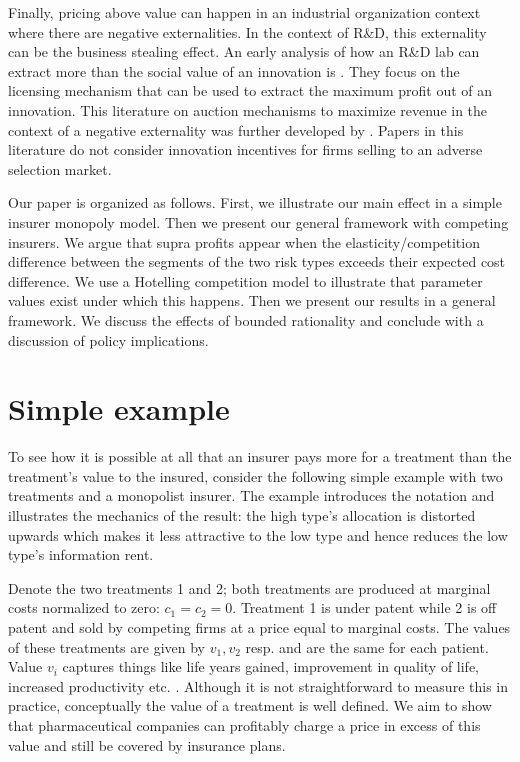 \documentclass[a4paper,12pt]{article}
\begin{document}
Finally, pricing above value can happen in an industrial organization context where there are negative externalities. In the context of R\&D, this externality can be the business stealing effect. An early analysis of how an R\&D lab can extract more than the social value of an innovation is \cite{KatzShapiro1986}. They focus on the licensing mechanism that can be used to extract the maximum profit out of an innovation. This literature on auction mechanisms to maximize revenue in the context of a negative externality was further developed by \cite{jehiel1996}. Papers in this literature do not consider innovation incentives for firms selling to an adverse selection market.

Our paper is organized as follows. First, we illustrate our main effect in a simple insurer monopoly model. Then we present our general framework with competing insurers. We argue that supra profits appear when the elasticity/competition difference between the segments of the two risk types exceeds their expected cost difference. We use a Hotelling competition model to illustrate that parameter values exist under which this happens. Then we present our results in a general framework. We discuss the effects of bounded rationality and conclude with a discussion of policy implications.

\section{Simple example}
\label{sec:org5b31619}

To see how it is possible at all that an insurer pays more for a treatment than the treatment's value to the insured, consider the following simple example with two treatments and a monopolist insurer. The example introduces the notation and illustrates the mechanics of the result: the high type's allocation is distorted upwards which makes it less attractive to the low type and hence reduces the low type's information rent.

Denote the two treatments 1 and 2; both treatments are produced at marginal costs normalized to zero: \(c_1 = c_2 =0\). Treatment 1 is under patent while 2 is off patent and sold by competing firms at a price equal to marginal costs. The values of these treatments are given by \(v_1,v_2\) resp. and are the same for each patient. Value \(v_i\) captures things like life years gained, improvement in quality of life, increased productivity etc. \citep{Garrison2017}. Although it is not straightforward to measure this in practice, conceptually the value of a treatment is well defined. We aim to show that pharmaceutical companies can profitably charge a price in excess of this value and still be covered by insurance plans.
\end{document}
